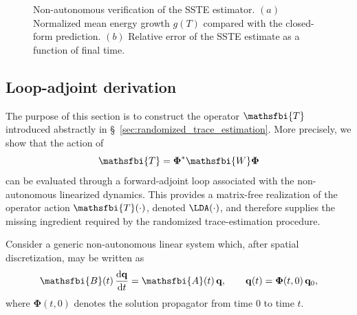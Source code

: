 \begin{appendices}
\begin{figure}[t]
    \centering
    \begin{minipage}[t]{0.48\textwidth}
        \centering
        \vspace{0pt}
        
    \end{minipage}
    \hfill
    \begin{minipage}[t]{0.48\textwidth}
        \centering
        \vspace{0pt}
        
    \end{minipage}
    \caption{Non-autonomous verification of the SSTE estimator. \((a)\) Normalized mean energy growth \(g(T)\) compared with the closed-form prediction. \((b)\) Relative error of the SSTE estimate as a function of final time.}
    \label{fig:nonautonomous_hutchpp}
\end{figure}


\subsection{Loop-adjoint derivation}
\label{sec:appendix_loop_adjoint}

The purpose of this section is to construct the operator \(\mathsfbi{T}\) introduced abstractly in \S~\ref{sec:randomized_trace_estimation}. More precisely, we show that the action of
\begin{equation}
  \mathsfbi{T}
  =
  \boldsymbol{\Phi}^{*}\mathsfbi{W}\boldsymbol{\Phi}
  \label{eq:loop_T_definition}
\end{equation}
can be evaluated through a forward-adjoint loop associated with the non-autonomous linearized dynamics. This provides a matrix-free realization of the operator action \(\mathsfbi{T}(\cdot)\), denoted \(\LDA(\cdot)\), and therefore supplies the missing ingredient required by the randomized trace-estimation procedure.

Consider a generic non-autonomous linear system which, after spatial discretization, may be written as
\begin{equation}
  \mathsfbi{B}(t)\,\frac{\mathrm{d}\mathbf{q}}{\mathrm{d}t}
  =
  \mathsfbi{A}(t)\,\mathbf{q},
  \qquad
  \mathbf{q}(t)
  =
  \boldsymbol{\Phi}(t,0)\,\mathbf{q}_0,
  \label{eq:loop_direct_system}
\end{equation}
where \(\boldsymbol{\Phi}(t,0)\) denotes the solution propagator from time \(0\) to time \(t\).


\end{appendices}
